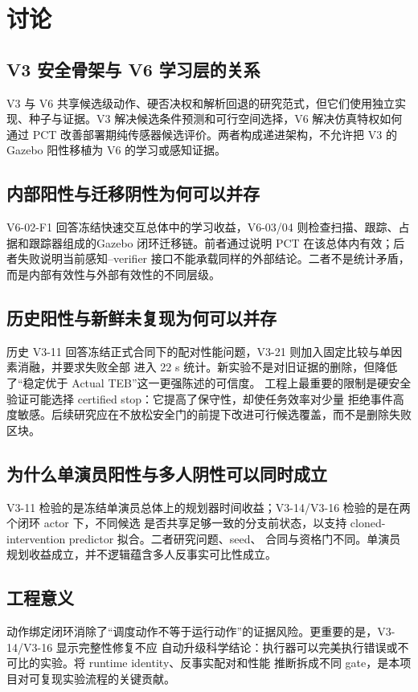 \documentclass[12pt,a4paper,oneside]{report}
\begin{document}




\chapter{讨论}
\section{V3 安全骨架与 V6 学习层的关系}
V3 与 V6 共享候选级动作、硬否决权和解析回退的研究范式，但它们使用独立实现、种子与证据。V3 解决候选条件预测和可行空间选择，V6 解决仿真特权如何通过 PCT 改善部署期纯传感器候选评价。两者构成递进架构，不允许把 V3 的 Gazebo 阳性移植为 V6 的学习或感知证据。

\section{内部阳性与迁移阴性为何可以并存}
V6-02-F1 回答冻结快速交互总体中的学习收益，V6-03/04 则检查扫描、跟踪、占据和跟踪器组成的Gazebo 闭环迁移链。前者通过说明 PCT 在该总体内有效；后者失败说明当前感知--verifier 接口不能承载同样的外部结论。二者不是统计矛盾，而是内部有效性与外部有效性的不同层级。

\section{历史阳性与新鲜未复现为何可以并存}
历史 V3-11 回答冻结正式合同下的配对性能问题，V3-21 则加入固定比较与单因素消融，并要求失败全部
进入 22 s 统计。新实验不是对旧证据的删除，但降低了“稳定优于 Actual TEB”这一更强陈述的可信度。
工程上最重要的限制是硬安全验证可能选择 certified stop：它提高了保守性，却使任务效率对少量
拒绝事件高度敏感。后续研究应在不放松安全门的前提下改进可行候选覆盖，而不是删除失败区块。

\section{为什么单演员阳性与多人阴性可以同时成立}
V3-11 检验的是冻结单演员总体上的规划器时间收益；V3-14/V3-16 检验的是在两个闭环 actor 下，不同候选
是否共享足够一致的分支前状态，以支持 cloned-intervention predictor 拟合。二者研究问题、seed、
合同与资格门不同。单演员规划收益成立，并不逻辑蕴含多人反事实可比性成立。

\section{工程意义}
动作绑定闭环消除了“调度动作不等于运行动作”的证据风险。更重要的是，V3-14/V3-16 显示完整性修复不应
自动升级科学结论：执行器可以完美执行错误或不可比的实验。将 runtime identity、反事实配对和性能
推断拆成不同 gate，是本项目对可复现实验流程的关键贡献。
\end{document}
